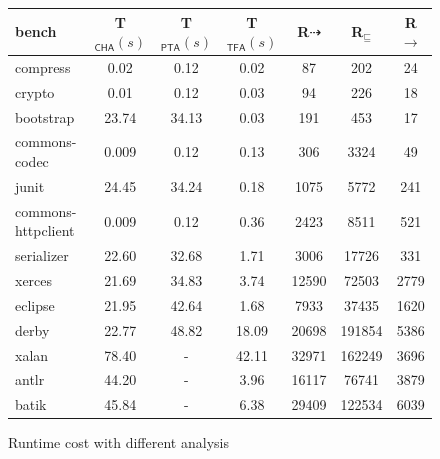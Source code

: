 \documentclass{llncs}
\newcommand{\less}{\sqsubseteq}
\newcommand{\tflow}{\dashrightarrow}
\begin{document}
\begin{figure}[t!]\centering
\begin{tabular}{lcccccc}
	\hline
	\textbf{bench} & \textbf{T$_{\textsf{CHA}}(s)$} & \textbf{T$_{\textsf{PTA}}(s)$} & \textbf{T$_{\textsf{TFA}}(s)$} & \hspace{2pt}\textbf{R${\tflow}$}\hspace{2pt} & \hspace{2pt}\textbf{R$_{\less}$}\hspace{2pt} & \hspace{2pt}\textbf{R${\rightarrow}$} \hspace{2pt}\\
	\hline
	compress & 0.02 & 0.12 & 0.02 & 87 & 202 & 24\\
	crypto & 0.01 & 0.12 & 0.03 & 94 & 226 & 18\\
	bootstrap & 23.74 & 34.13 & 0.03 & 191 & 453 & 17\\
	commons-codec & 0.009 & 0.12 & 0.13 & 306 & 3324 & 49\\
	junit & 24.45 & 34.24 & 0.18 & 1075 & 5772 & 241\\
	commons-httpclient & 0.009 & 0.12 & 0.36 & 2423 & 8511 & 521 \\
	serializer & 22.60 & 32.68 & 1.71 & 3006 & 17726 & 331\\
	xerces & 21.69 & 34.83 & 3.74 & 12590 & 72503 & 2779\\
	eclipse & 21.95 & 42.64 & 1.68 & 7933 & 37435 & 1620\\
	derby & 22.77 & 48.82 & 18.09 & 20698 & 191854 & 5386\\
	xalan & 78.40 & - & 42.11 & 32971 & 162249 & 3696\\
	antlr & 44.20 & - & 3.96 & 16117 & 76741 & 3879\\
	batik & 45.84 & - & 6.38 & 29409 & 122534 & 6039 \\
	\hline
\end{tabular}
\caption{Runtime cost with different analysis}
\label{experiment:TimeCost}
\end{figure}
\end{document}
